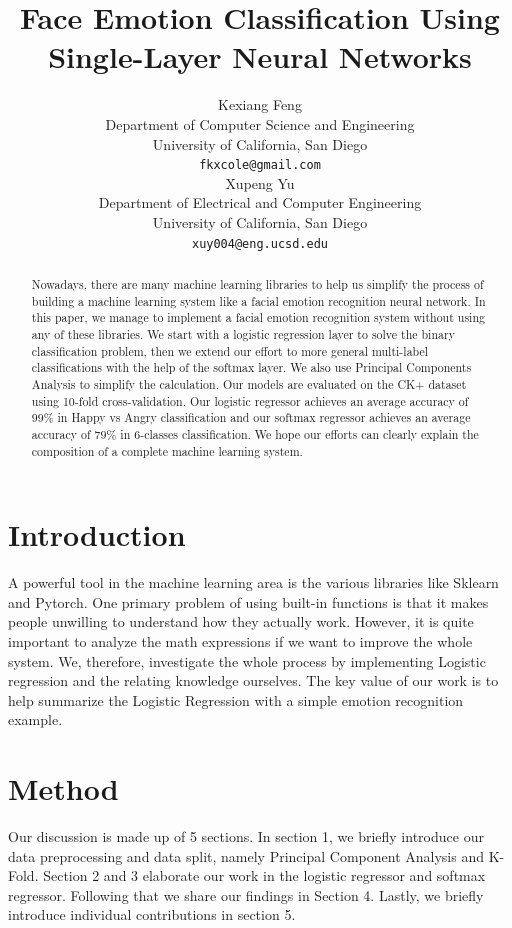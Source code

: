 \documentclass{article} %
\title{Face Emotion Classification Using Single-Layer Neural Networks}
\author{
Kexiang Feng \\
Department of Computer Science and Engineering\\
University of California, San Diego\\
\texttt{fkxcole@gmail.com} \\
\And
Xupeng Yu \\
Department of Electrical and Computer Engineering \\
University of California, San Diego \\
\texttt{xuy004@eng.ucsd.edu}
}
\begin{document}
\maketitle

\begin{abstract}
Nowadays, there are many machine learning libraries to help us simplify the process of building a machine learning system like a facial emotion recognition neural network. In this paper, we manage to implement a facial emotion recognition system without using any of these libraries. We start with a logistic regression layer to solve the binary classification problem, then we extend our effort to more general multi-label classifications with the help of the softmax layer. We also use Principal Components Analysis to simplify the calculation. Our models are evaluated on the CK+ dataset using 10-fold cross-validation. Our logistic regressor achieves an average accuracy of $ 99\% $ in Happy vs Angry classification and our softmax regressor achieves an average accuracy of $79\%$ in 6-classes classification. We hope our efforts can clearly explain the composition of a complete machine learning system. 
\end{abstract}

\section{Introduction}
A powerful tool in the machine learning area is the various libraries like Sklearn and Pytorch. One primary problem of using built-in functions is that it makes people unwilling to understand how they actually work. However, it is quite important to analyze the math expressions if we want to improve the whole system. We, therefore, investigate the whole process by implementing Logistic regression and the relating knowledge ourselves. The key value of our work is to help summarize the Logistic Regression with a simple emotion recognition example.

\section{Method}
Our discussion is made up of 5 sections. In section 1, we briefly introduce our data preprocessing and data split, namely Principal Component Analysis and K-Fold. Section 2 and 3 elaborate our work in the logistic regressor and softmax regressor. Following that we share our findings in Section 4. Lastly, we briefly introduce individual contributions in section 5.
\end{document}
